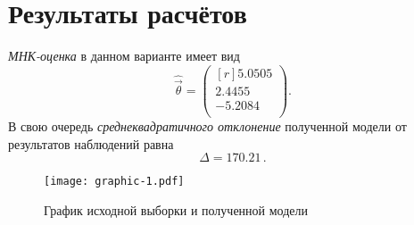 \section{Результаты расчётов}
\emph{МНК-оценка} в данном варианте имеет вид
\begin{equation}
    \hat{\vec{\theta}} = \begin{pmatrix*}[r]
        5.0505  \\
        2.4455  \\
        -5.2084 \\
    \end{pmatrix*}.
\end{equation}
В свою очередь \emph{среднеквадратичного отклонение} полученной модели от результатов наблюдений равна
\begin{equation}
    \Delta = 170.21\,.
\end{equation}

\begin{figure}[h]
    \centering
    \texttt{[image: graphic-1.pdf]}
    \caption{График исходной выборки и полученной модели}
\end{figure}